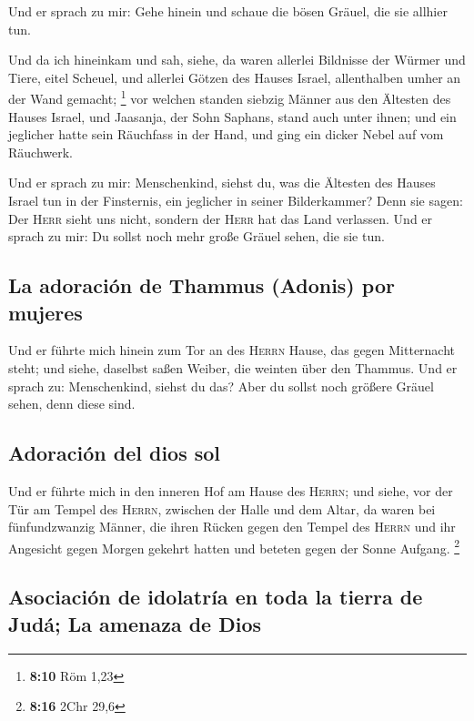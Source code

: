  Und er sprach zu mir: Gehe hinein und schaue die bösen
Gräuel, die sie allhier tun.

 Und da ich hineinkam und sah, siehe, da waren allerlei
Bildnisse der Würmer und Tiere, eitel Scheuel, und allerlei Götzen des
Hauses Israel, allenthalben umher an der Wand gemacht; \footnote{\textbf{8:10}
  Röm 1,23}  vor welchen standen siebzig Männer aus den
Ältesten des Hauses Israel, und Jaasanja, der Sohn Saphans, stand auch
unter ihnen; und ein jeglicher hatte sein Räuchfass in der Hand, und
ging ein dicker Nebel auf vom Räuchwerk.

 Und er sprach zu mir: Menschenkind, siehst du, was die
Ältesten des Hauses Israel tun in der Finsternis, ein jeglicher in
seiner Bilderkammer? Denn sie sagen: Der \textsc{Herr} sieht uns nicht,
sondern der \textsc{Herr} hat das Land verlassen.  Und er
sprach zu mir: Du sollst noch mehr große Gräuel sehen, die sie tun.

\hypertarget{la-adoraciuxf3n-de-thammus-adonis-por-mujeres}{%
\subsection{La adoración de Thammus (Adonis) por
mujeres}\label{la-adoraciuxf3n-de-thammus-adonis-por-mujeres}}

 Und er führte mich hinein zum Tor an des \textsc{Herrn}
Hause, das gegen Mitternacht steht; und siehe, daselbst saßen Weiber,
die weinten über den Thammus.  Und er sprach zu:
Menschenkind, siehst du das? Aber du sollst noch größere Gräuel sehen,
denn diese sind.

\hypertarget{adoraciuxf3n-del-dios-sol}{%
\subsection{Adoración del dios sol}\label{adoraciuxf3n-del-dios-sol}}

 Und er führte mich in den inneren Hof am Hause des
\textsc{Herrn}; und siehe, vor der Tür am Tempel des \textsc{Herrn},
zwischen der Halle und dem Altar, da waren bei fünfundzwanzig Männer,
die ihren Rücken gegen den Tempel des \textsc{Herrn} und ihr Angesicht
gegen Morgen gekehrt hatten und beteten gegen der Sonne Aufgang.
\footnote{\textbf{8:16} 2Chr 29,6}

\hypertarget{asociaciuxf3n-de-idolatruxeda-en-toda-la-tierra-de-juduxe1-la-amenaza-de-dios}{%
\subsection{Asociación de idolatría en toda la tierra de Judá; La
amenaza de
Dios}\label{asociaciuxf3n-de-idolatruxeda-en-toda-la-tierra-de-juduxe1-la-amenaza-de-dios}}

